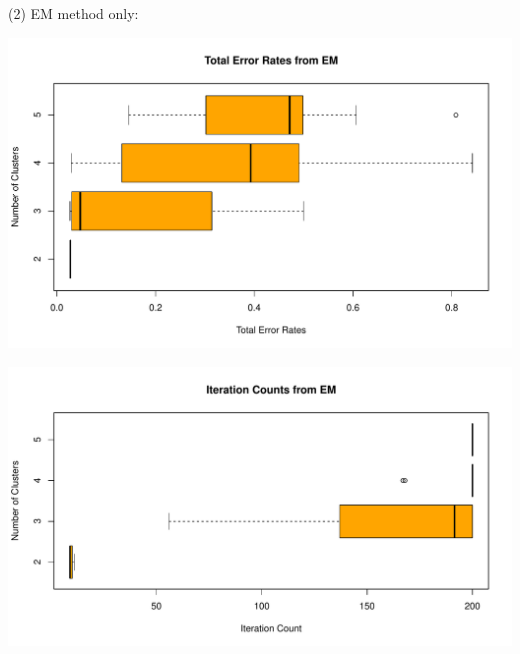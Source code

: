 \documentclass[a4paper,12pt]{article}
\begin{document}
\noindent (2) EM method only:
\begin{center}
  \includegraphics[width=0.8\linewidth]{Image/Prob3-TotalErr-Ringnorm-EM.pdf}
\end{center}
\begin{center}
  \includegraphics[width=0.8\linewidth]{Image/Prob3-ItrCount-Ringnorm-EM.pdf}
\end{center}
\bigskip
\end{document}
